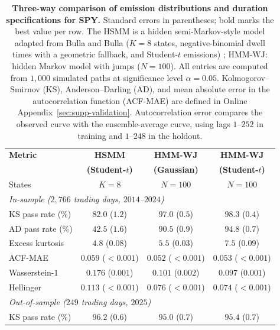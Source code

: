 \begin{table}[H]
\centering
\caption{\textbf{Three-way comparison of emission distributions and
    duration specifications for SPY.} Standard
    errors in parentheses; bold marks the best value per row. The HSMM
    is a hidden semi-Markov-style model adapted from Bulla and Bulla
    ($K = 8$ states, negative-binomial dwell times with a geometric
    fallback, and Student-$t$ emissions) \cite{bullaBulla2006}; HMM-WJ:
    hidden Markov model with jumps
    ($N = 100$). All entries are computed from $1{,}000$ simulated
    paths at significance level $\alpha = 0.05$. Kolmogorov--Smirnov
    (KS), Anderson--Darling (AD), and mean absolute error in the
    autocorrelation function (ACF-MAE) are defined in
    Online Appendix~\ref{sec:supp-validation}. Autocorrelation error
    compares the observed curve with the ensemble-average curve,
    using lags $1$--$252$ in training and $1$--$248$ in the holdout.}
\label{tab:emission_hsmm}
\small
\begin{tabular}{@{}lccc@{}}
\toprule
\textbf{Metric} & \textbf{HSMM} & \textbf{HMM-WJ} & \textbf{HMM-WJ} \\
                & \textbf{(Student-$t$)} & \textbf{(Gaussian)} & \textbf{(Student-$t$)} \\ \midrule
States              & $K = 8$ & $N = 100$ & $N = 100$ \\[4pt]
\multicolumn{4}{l}{\textit{In-sample ($2{,}766$ trading days, $2014$--$2024$)}} \\[2pt]
KS pass rate (\%)   &  $82.0$ ($1.2$)         &  $97.0$ ($0.5$)         & $\mathbf{98.3}$ ($0.4$) \\
AD pass rate (\%)   &  $42.5$ ($1.6$)         &  $90.5$ ($0.9$)         & $\mathbf{94.8}$ ($0.7$) \\
Excess kurtosis     &   $4.8$ ($0.08$)        &   $5.5$ ($0.03$)        & $\mathbf{7.5}$ ($0.09$) \\
ACF-MAE             & $0.059$ ($<\!0.001$)    & $\mathbf{0.052}$ ($<\!0.001$) & $0.053$ ($<\!0.001$) \\
Wasserstein-$1$     & $0.176$ ($0.001$)       & $0.101$ ($0.002$)       & $\mathbf{0.097}$ ($0.001$) \\
Hellinger           & $0.113$ ($<\!0.001$)    & $0.076$ ($<\!0.001$)   & $\mathbf{0.074}$ ($<\!0.001$) \\[4pt]
\multicolumn{4}{l}{\textit{Out-of-sample ($249$ trading days, $2025$)}} \\[2pt]
KS pass rate (\%)   & $\mathbf{96.2}$ ($0.6$) &  $95.0$ ($0.7$)         &  $95.4$ ($0.7$) \\

\end{tabular}
\end{table}
